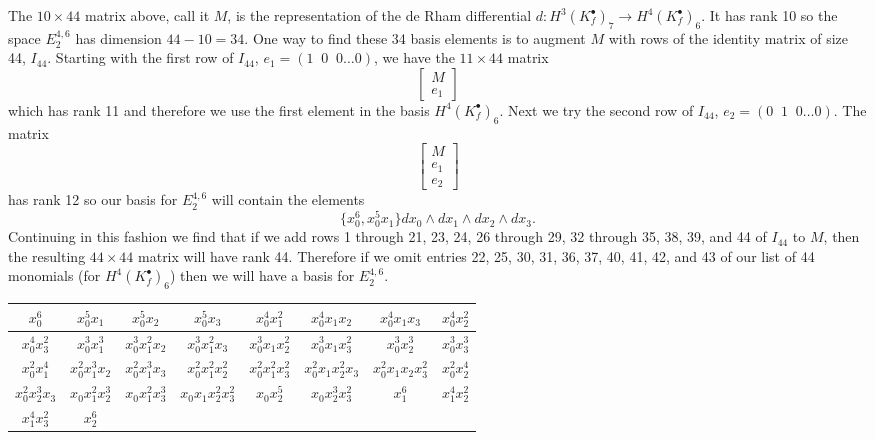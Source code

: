 \documentclass[10pt,oneside,reqno]{amsart}
\begin{document}
	The $10\times44$ matrix above, call it $M$, is the representation of the de Rham differential $d:H^3(K_f^{\bullet})_7\rightarrow H^4(K_f^{\bullet})_6$.  It has rank 10 so the space $E_2^{4,6}$ has dimension $44-10=34$.  One way to find these 34 basis elements is to augment $M$ with rows of the identity matrix of size 44, $I_{44}$.  Starting with the first row of $I_{44}$, $e_1=(1\;\;0\;\;0\dots0)$, we have the $11\times44$ matrix
	\begin{equation*}
		\begin{bmatrix}
			M \\
			e_1
		\end{bmatrix}
	\end{equation*}
	which has rank 11 and therefore we use the first element in the basis $H^4(K_f^{\bullet})_6$.  Next we try the second row of $I_{44}$, $e_2=(0\;\;1\;\;0\dots0)$.  The matrix
	\begin{equation*}
		\begin{bmatrix}
			M \\
			e_1 \\
			e_2
		\end{bmatrix}
	\end{equation*}
	has rank 12 so our basis for $E_2^{4,6}$ will contain the elements
	\begin{equation*}
		\{x_0^6,x_0^5x_1\}dx_0\wedge dx_1\wedge dx_2\wedge dx_3.
	\end{equation*}
	Continuing in this fashion we find that if we add rows 1 through 21, 23, 24, 26 through 29, 32 through 35, 38, 39, and 44 of $I_{44}$ to $M$, then the resulting $44\times44$ matrix will have rank 44.  Therefore if we omit entries 22, 25, 30, 31, 36, 37, 40, 41, 42, and 43 of our list of 44 monomials (for $H^4(K_f^{\bullet})_6$) then we will have a basis for $E_2^{4,6}$.
	
	\vspace{3mm}
	
	\begin{center}
		\begin{tabular}{ |c|c|c|c|c|c|c|c| }
			\hline
			\rule{0pt}{2.5ex}$x_0^6$ & $x_0^5x_1$ & $x_0^5x_2$ & $x_0^5x_3$ & $x_0^4x_1^2$ & $x_0^4x_1x_2$ & $x_0^4x_1x_3$ & $x_0^4x_2^2$ \\
			\hline
			\rule{0pt}{2.5ex}$x_0^4x_3^2$ & $x_0^3x_1^3$ & $x_0^3x_1^2x_2$ & $x_0^3x_1^2x_3$ & $x_0^3x_1x_2^2$ & $x_0^3x_1x_3^2$ & $x_0^3x_2^3$ & $x_0^3x_3^3$ \\
			\hline
			\rule{0pt}{2.5ex}$x_0^2x_1^4$ & $x_0^2x_1^3x_2$ & $x_0^2x_1^3x_3$ & $x_0^2x_1^2x_2^2$ & $x_0^2x_1^2x_3^2$ & $x_0^2x_1x_2^2x_3$ & $x_0^2x_1x_2x_3^2$ & $x_0^2x_2^4$ \\
			\hline
			\rule{0pt}{2.5ex}$x_0^2x_2^3x_3$ & $x_0x_1^2x_2^3$ & $x_0x_1^2x_3^3$ & $x_0x_1x_2^2x_3^2$ & $x_0x_2^5$ & $x_0x_2^3x_3^2$ & $x_1^6$ & $x_1^4x_2^2$ \\
			\hline
			\rule{0pt}{2.5ex}$x_1^4x_3^2$ & $x_2^6$ & \multicolumn{6}{r}{} \\ \cline{1-2}
		\end{tabular}
	\end{center}
	
	\vspace{3mm}
	

	
	
	
\end{document}
